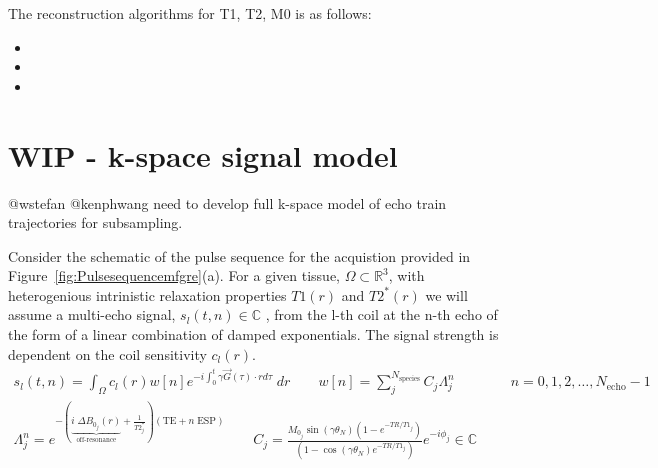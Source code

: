 \documentclass{article}         %
\theoremstyle{definition}
\theoremstyle{remark}
\begin{document}
The reconstruction algorithms for T1, T2, M0 is as follows:
\begin{itemize}
\item 
\item 
\item 
\end{itemize}

\section{WIP - k-space signal model}


{\color{red} @wstefan @kenphwang need to develop full k-space model of echo train trajectories for subsampling.}

Consider the schematic of the pulse sequence for the  acquistion provided in
Figure~\ref{fig:Pulsesequencemfgre}(a).
For a  given tissue, $\Omega \subset \mathbb{R}^3$,
with heterogenious intrinistic relaxation properties $T1(r)$ and $T2^*(r)$
we will assume a multi-echo signal, $s_l(t,n)\in\mathbb{C}$ ,
from the l-th coil at the n-th echo 
of the form of a linear combination of damped exponentials. 
The signal strength is dependent on the coil sensitivity $c_l(r)$.
\begin{equation}
\label{multiechosignalmodel}
\begin{split}
 s_l(t,n) = \int_\Omega c_l(r)  w[n] e^{-i \int_0^t \gamma \vec{G}(\tau)\cdot r d \tau} \; dr
\qquad
 w[n]  = \sum_j^{N_\text{species}} 
 C_j \Lambda_j^n 
  \qquad  \qquad n = 0,1,2,\dots,N_\text{echo}-1
\\
\Lambda_j^n  = e^{-\left( 
\underbrace{i\; \Delta B_{0_j}(r) }_\text{off-resonance} 
+
\frac{1}{T2^*_j} \right) \left( \text{TE} + n \; \text{ESP}\right) } 
\quad  \quad
C_j = \frac{M_{0_j} \sin \left(\gamma \theta_N \right)\left( 1- e^{-TR/T1_j}\right)}{\left( 1- \cos \left(\gamma \theta_N \right) e^{-TR/T1_j}\right)}
e^{-i  \phi_j} 
\in  \mathbb{C} 
\end{split}
\end{equation}
\end{document}
